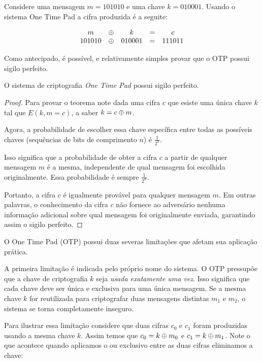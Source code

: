 \begin{example}
  Considere uma mensagem $m = 101010$ e uma chave $k = 010001$.
Usando o sistema One Time Pad a cifra produzida é a seguite:

\begin{displaymath}
  \begin{array}{ccccc}
    m & \oplus & k & = & c \\
    101010 & \oplus & 010001 & = & 111011
  \end{array}
\end{displaymath}
\end{example}




Como antecipado, é possível, e relativamente simples provar que o OTP possui sigilo perfeito.

\begin{theorem}
  O sistema de criptografia {\em One Time Pad} possui sigilo perfeito.
\end{theorem}
\begin{proof}
Para provar o teorema note dada uma cifra $c$ que esiste uma única chave $k$ tal que $E(k,m = c)$, a saber $k = c \oplus m$.

Agora, a probabilidade de escolher essa chave específica entre todas as possíveis chaves (sequências de bits de comprimento $n$) é $\frac{1}{2^n}$.

Isso significa que a probabilidade de obter a cifra $c$ a partir de qualquer mensagem $m$ é a mesma, independente de qual mensagem foi escolhida originalmente.
Essa probabilidade é sempre $\frac{1}{2^n}$.

Portanto, a cifra $c$ é igualmente provável para qualquer mensagem $m$.
Em outras palavras, o conhecimento da cifra $c$ não fornece ao adversário nenhuma informação adicional sobre qual mensagem foi originalmente enviada, garantindo assim o sigilo perfeito.
\end{proof}

O One Time Pad (OTP) possui duas severas limitações que afetam sua aplicação prática.

A primeira limitação é indicada pelo próprio nome do sistema.
O OTP pressupõe que a chave de criptografia $k$ seja {\em usada exatamente uma vez}.
Isso significa que cada chave deve ser única e exclusiva para uma única mensagem.
Se a mesma chave $k$ for reutilizada para criptografar duas mensagens distintas $m_1$ e $m_2$, o sistema se torna completamente inseguro.

Para ilustrar essa limitação considere que duas cifras $c_0$ e $c_1$ foram produzidas usando a mesma chave $k$.
Assim temos que $c_0 = k \oplus m_0$ e $c_1 = k \oplus m_1$.
Note o que acontece quando aplicamos o ou exclusivo entre as duas cifras eliminamos a chave:

